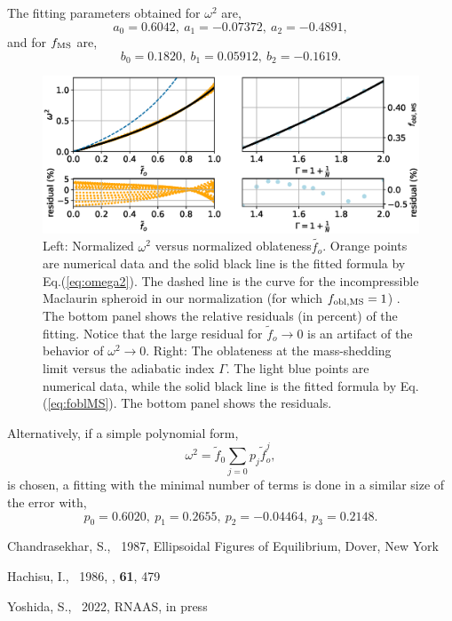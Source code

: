 \documentclass[RNAAS, a4paper, dvipdfmx]{aastex631} %
\begin{document}
The fitting parameters obtained for $\omega^2$ are,
\begin{equation}
	a_0 = 0.6042, ~a_1=-0.07372, ~a_2=-0.4891, 
\end{equation}
and for $f_{\rm MS}$ are,
\begin{equation}
	b_0=0.1820,~ b_1=0.05912,~ b_2=-0.1619.
\end{equation}

\begin{figure}[h!]
\begin{center}
\includegraphics[scale=0.7]{fittingW2.eps}
\caption{Left: Normalized $\omega^2$ versus normalized oblateness$\tilde{f_o}$. Orange points
are numerical data and the solid black line is the fitted formula by Eq.(\ref{eq:omega2}).
The dashed line is the curve for the incompressible Maclaurin spheroid \citep{Chandrasekhar}
in our normalization  (for which $f_{\rm obl, MS}=1$) .
The bottom panel shows the relative residuals (in percent) of the fitting. Notice that the
large residual for $\tilde{f}_o\to 0$ is an artifact of the behavior of $\omega^2\to 0$. 
Right: The oblateness at the mass-shedding limit
versus the adiabatic index $\Gamma$. The light blue points are numerical data, while
the solid black line is the fitted formula by Eq.(\ref{eq:foblMS}).
The bottom panel shows the residuals.
\label{fig:1}}
\end{center}
\end{figure}

Alternatively, if a simple polynomial form,
\begin{equation}
	\omega^2 = \tilde{f}_0\sum_{j=0}p_j \tilde{f}_o^j,
\end{equation}
is chosen, a fitting with the minimal number of terms 
is done in a similar size of the error with,
\begin{equation}
	p_0=0.6020,~ p_1=0.2655,~ p_2=-0.04464,~ p_3=0.2148.
\end{equation}


\begin{thebibliography}{}

 Chandrasekhar, S., \ 1987, Ellipsoidal Figures of Equilibrium, Dover, New York

 Hachisu, I., \ 1986, \apjs, {\bf 61}, 479

 Yoshida, S., \ 2022, RNAAS, in press

\end{thebibliography}
\end{document}
